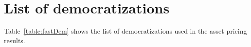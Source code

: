 \section{List of democratizations}

Table~\ref{table:fastDem} shows the list of democratizations used in the asset pricing results.

\newpage

